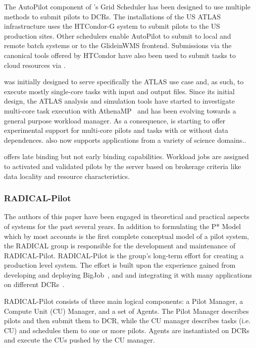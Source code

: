 \documentclass{sig-alternate}
\begin{document}
The AutoPilot component of \panda's Grid Scheduler has been designed to use
multiple methods to submit pilots to DCRs. The \panda installations of the US
ATLAS infrastructure uses the HTCondor-G system to submit pilots to the US
production sites. Other schedulers enable AutoPilot to submit to local and
remote batch systems or to the GlideinWMS frontend. Submissions via the
canonical tools offered by HTCondor have also been used to submit tasks to cloud
resources via
\panda.

\panda was initially designed to serve specifically the ATLAS use case and, as
such, to execute mostly single-core tasks with input and output files. Since its
initial design, the ATLAS analysis and simulation tools have started to
investigate multi-core task execution with AthenaMP~\cite{crooks2012} and \panda
has been evolving towards a general purpose workload manager. As a consequence,
\panda is starting to offer experimental support for multi-core pilots and tasks
with or without data dependences. \panda also now supports applications from a
variety of science domains.\cite{x,y}.

\panda offers late binding but not early binding capabilities. Workload jobs are
assigned to activated and validated pilots by the \panda server based on
brokerage criteria like data locality and resource characteristics.

%
\subsubsection{RADICAL-Pilot}
\label{sec:radical_pilot}

The authors of this paper have been engaged in theoretical and practical aspects
of \pilot systems for the past several years. In addition to formulating the P*
Model~\cite{luckow2012} which by most accounts is the first complete conceptual
model of a pilot system, the RADICAL group is responsible for the development
and maintenance of RADICAL-Pilot\cite{rp-paper2015,rp_url}. RADICAL-Pilot is the
group's long-term effort for creating a production level \pilot system. The
effort is built upon the experience gained from developing and deploying
BigJob~\cite{luckow2010}, and and integrating it with many applications on
different DCRs~\cite{x,y,z}.

RADICAL-Pilot consists of three main logical components: a Pilot Manager, a Compute Unit
(CU) Manager, and a set of Agents. The Pilot Manager describes pilots and then
submit them to DCR, while the CU manager describes tasks (i.e. CU) and schedules
them to one or more pilots. Agents are instantiated on DCRs and execute the CUs
pushed by the CU manager.
\end{document}

